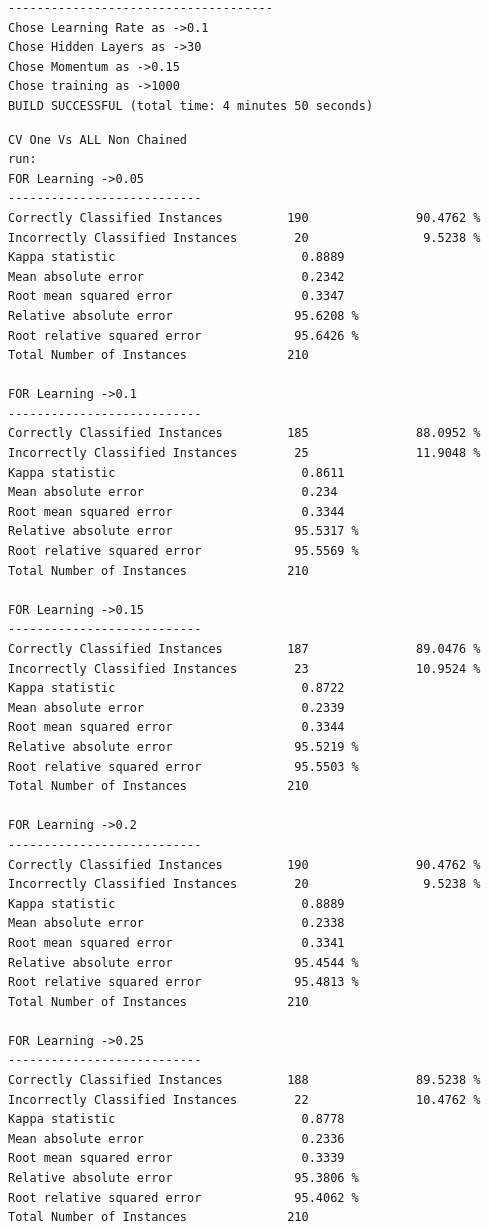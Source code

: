 \documentclass[fontsize=10pt,DIV=14]{scrartcl}
\begin{document}
\begin{itemize}
\begin{verbatim}
-------------------------------------
Chose Learning Rate as ->0.1
Chose Hidden Layers as ->30
Chose Momentum as ->0.15
Chose training as ->1000
BUILD SUCCESSFUL (total time: 4 minutes 50 seconds)

\end{verbatim}
\begin{verbatim}
CV One Vs ALL Non Chained
run:
FOR Learning ->0.05 
---------------------------
Correctly Classified Instances         190               90.4762 %
Incorrectly Classified Instances        20                9.5238 %
Kappa statistic                          0.8889
Mean absolute error                      0.2342
Root mean squared error                  0.3347
Relative absolute error                 95.6208 %
Root relative squared error             95.6426 %
Total Number of Instances              210     

FOR Learning ->0.1 
---------------------------
Correctly Classified Instances         185               88.0952 %
Incorrectly Classified Instances        25               11.9048 %
Kappa statistic                          0.8611
Mean absolute error                      0.234 
Root mean squared error                  0.3344
Relative absolute error                 95.5317 %
Root relative squared error             95.5569 %
Total Number of Instances              210     

FOR Learning ->0.15 
---------------------------
Correctly Classified Instances         187               89.0476 %
Incorrectly Classified Instances        23               10.9524 %
Kappa statistic                          0.8722
Mean absolute error                      0.2339
Root mean squared error                  0.3344
Relative absolute error                 95.5219 %
Root relative squared error             95.5503 %
Total Number of Instances              210     

FOR Learning ->0.2 
---------------------------
Correctly Classified Instances         190               90.4762 %
Incorrectly Classified Instances        20                9.5238 %
Kappa statistic                          0.8889
Mean absolute error                      0.2338
Root mean squared error                  0.3341
Relative absolute error                 95.4544 %
Root relative squared error             95.4813 %
Total Number of Instances              210     

FOR Learning ->0.25 
---------------------------
Correctly Classified Instances         188               89.5238 %
Incorrectly Classified Instances        22               10.4762 %
Kappa statistic                          0.8778
Mean absolute error                      0.2336
Root mean squared error                  0.3339
Relative absolute error                 95.3806 %
Root relative squared error             95.4062 %
Total Number of Instances              210     


\end{verbatim}
\end{itemize}
\end{document}
